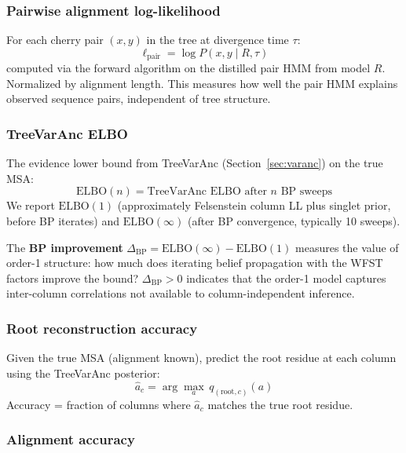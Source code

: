 \subsubsection{Pairwise alignment log-likelihood}

For each cherry pair $(x, y)$ in the tree at divergence time $\tau$:
\begin{equation}
\ell_{\text{pair}} = \log P(x, y \mid R, \tau)
\end{equation}
computed via the forward algorithm on the distilled pair HMM from model $R$.
Normalized by alignment length.
This measures how well the pair HMM explains observed sequence pairs,
independent of tree structure.

\subsubsection{TreeVarAnc ELBO}

The evidence lower bound from TreeVarAnc (Section~\ref{sec:varanc})
on the true MSA:
\begin{equation}
\mathrm{ELBO}(n) = \text{TreeVarAnc ELBO after } n \text{ BP sweeps}
\end{equation}
We report $\mathrm{ELBO}(1)$ (approximately Felsenstein column LL
plus singlet prior, before BP iterates) and $\mathrm{ELBO}(\infty)$
(after BP convergence, typically 10 sweeps).

The \textbf{BP improvement} $\Delta_{\mathrm{BP}} = \mathrm{ELBO}(\infty) - \mathrm{ELBO}(1)$
measures the value of order-1 structure: how much does iterating
belief propagation with the WFST factors improve the bound?
$\Delta_{\mathrm{BP}} > 0$ indicates that the order-1 model captures
inter-column correlations not available to column-independent inference.

\subsubsection{Root reconstruction accuracy}

Given the true MSA (alignment known), predict the root residue at
each column using the TreeVarAnc posterior:
\begin{equation}
\hat{a}_c = \arg\max_a \, q_{(\text{root}, c)}(a)
\end{equation}
Accuracy = fraction of columns where $\hat{a}_c$ matches the true
root residue.

\subsubsection{Alignment accuracy}

